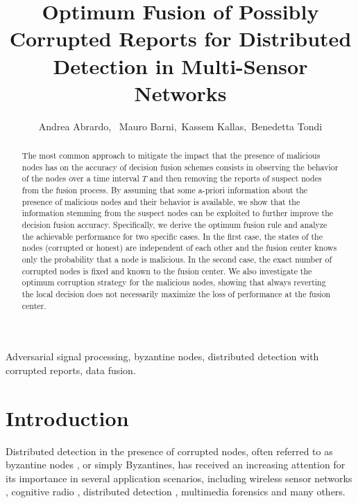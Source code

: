 \documentclass[10pt,peerreview,draftcls,onecolumn]{IEEEtran}
\begin{document}
\title{Optimum Fusion of Possibly Corrupted Reports for Distributed Detection in Multi-Sensor Networks}




\author{Andrea Abrardo,~ Mauro Barni,~Kassem Kallas,~Benedetta Tondi


}
\maketitle

\begin{abstract}
The most common approach to mitigate the impact that the presence of malicious nodes has on the accuracy of decision fusion schemes consists in  observing the behavior of the nodes over a time interval $T$ and then removing the reports of suspect nodes from the fusion process. By assuming that some a-priori information about the presence of malicious nodes and their behavior is available, we show that the information stemming from the suspect nodes can be exploited to further improve the decision fusion accuracy. Specifically, we derive the optimum fusion rule and analyze the achievable performance for two specific cases. In the first case, the states of the nodes (corrupted or honest) are independent of each other and the fusion center knows only the probability that a node is malicious. In the second case, the exact number of corrupted nodes is fixed and known to the fusion center. We also investigate the optimum corruption strategy for the malicious nodes, showing that always reverting the local decision does not necessarily maximize the loss of performance at the fusion center.
\end{abstract}

\begin{IEEEkeywords}
Adversarial signal processing, byzantine nodes, distributed detection with corrupted reports, data fusion.
\end{IEEEkeywords}

\IEEEpeerreviewmaketitle

\section{Introduction}
\label{sec.intro}

Distributed detection in the presence of corrupted nodes, often referred to as byzantine nodes \cite{Vemp13}, or simply Byzantines, has received an increasing attention for its importance in several application scenarios, including wireless sensor networks \cite{WSNvarshney,WSNanomalyDet}, cognitive radio \cite{WLSH10,Raw11}, distributed detection \cite{Mar09}, multimedia forensics \cite{Bar13} and many others.
\end{document}
